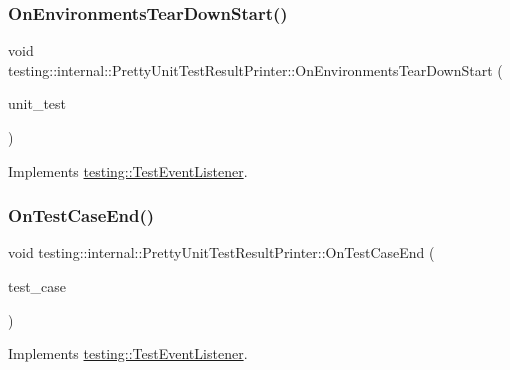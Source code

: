 \subsubsection{\texorpdfstring{OnEnvironmentsTearDownStart()}{OnEnvironmentsTearDownStart()}}
{\footnotesize\ttfamily void testing\+::internal\+::\+Pretty\+Unit\+Test\+Result\+Printer\+::\+On\+Environments\+Tear\+Down\+Start (\begin{DoxyParamCaption}\item[{const \mbox{\hyperlink{classtesting_1_1UnitTest}{Unit\+Test}} \&}]{unit\+\_\+test }\end{DoxyParamCaption})\hspace{0.3cm}{\ttfamily [virtual]}}



Implements \mbox{\hyperlink{classtesting_1_1TestEventListener_a468b5e6701bcb86cb2c956caadbba5e4}{testing\+::\+Test\+Event\+Listener}}.

\mbox{\label{classtesting_1_1internal_1_1PrettyUnitTestResultPrinter_a7a62fe58fa6f6aace813eb62b31e5a51}} 
\subsubsection{\texorpdfstring{OnTestCaseEnd()}{OnTestCaseEnd()}}
{\footnotesize\ttfamily void testing\+::internal\+::\+Pretty\+Unit\+Test\+Result\+Printer\+::\+On\+Test\+Case\+End (\begin{DoxyParamCaption}\item[{const \mbox{\hyperlink{classtesting_1_1TestCase}{Test\+Case}} \&}]{test\+\_\+case }\end{DoxyParamCaption})\hspace{0.3cm}{\ttfamily [virtual]}}



Implements \mbox{\hyperlink{classtesting_1_1TestEventListener_ae61985e2ef76ac78379b077be57a9c36}{testing\+::\+Test\+Event\+Listener}}.

\mbox{\label{classtesting_1_1internal_1_1PrettyUnitTestResultPrinter_adcb68c729565d4bcdf8418a52902c3de}} 
